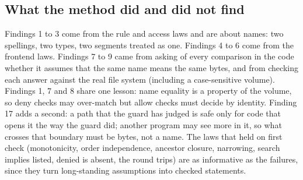 \subsection{What the method did and did not find}

Findings 1 to 3 come from the rule and access laws and are about names: two
spellings, two types, two segments treated as one.  Findings 4 to 6 come from
the frontend laws.  Findings 7 to 9 came from asking of every comparison in the
code whether it assumes that the same name means the same bytes, and from
checking each answer against the real file system (including a case-sensitive
volume).  Findings 1, 7 and 8 share one lesson: name equality is a property of
the volume, so deny checks may over-match but allow checks must decide by
identity.  Finding 17 adds a second: a path that the guard has judged is safe
only for code that opens it the way the guard did; another program may see more in
it, so what crosses that boundary must be bytes, not a name.  The laws that held on first check (monotonicity, order
independence, ancestor closure, narrowing, search implies listed, denied is
absent, the round trips) are as informative as the failures, since they turn
long-standing assumptions into checked statements.
